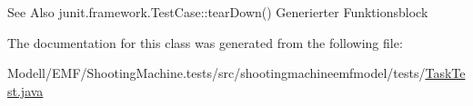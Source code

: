 \begin{DoxySeeAlso}{See Also}
junit.\-framework.\-Test\-Case\-::tear\-Down() Generierter Funktionsblock 
\end{DoxySeeAlso}


The documentation for this class was generated from the following file\-:\begin{DoxyCompactItemize}
\item 
Modell/\-E\-M\-F/\-Shooting\-Machine.\-tests/src/shootingmachineemfmodel/tests/\hyperlink{_task_test_8java}{Task\-Test.\-java}\end{DoxyCompactItemize}
